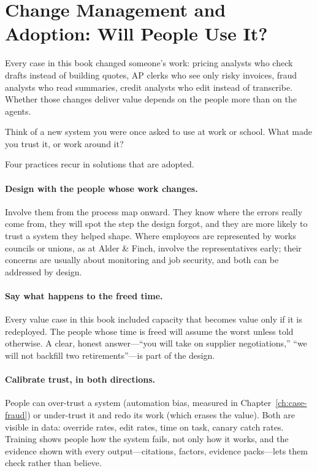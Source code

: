 \section{Change Management and Adoption: Will People Use It?}
\label{sec:cap-change}

Every case in this book changed someone's work: pricing analysts who check drafts instead of building quotes, AP clerks who see only risky invoices, fraud analysts who read summaries, credit analysts who edit instead of transcribe. Whether those changes deliver value depends on the people more than on the agents.

\begin{thinkabout}
Think of a new system you were once asked to use at work or school. What made you trust it, or work around it?
\end{thinkabout}

 Four practices recur in solutions that are adopted.

\paragraph{Design with the people whose work changes.} Involve them from the process map onward. They know where the errors really come from, they will spot the step the design forgot, and they are more likely to trust a system they helped shape. Where employees are represented by works councils or unions, as at Alder \& Finch, involve the representatives early; their concerns are usually about monitoring and job security, and both can be addressed by design.

\paragraph{Say what happens to the freed time.} Every value case in this book included capacity that becomes value only if it is redeployed. The people whose time is freed will assume the worst unless told otherwise. A clear, honest answer---``you will take on supplier negotiations,'' ``we will not backfill two retirements''---is part of the design.

\paragraph{Calibrate trust, in both directions.} People can over-trust a system (automation bias, measured in Chapter~\ref{ch:case-fraud}) or under-trust it and redo its work (which erases the value). Both are visible in data: override rates, edit rates, time on task, canary catch rates. Training shows people how the system fails, not only how it works, and the evidence shown with every output---citations, factors, evidence packs---lets them check rather than believe.

